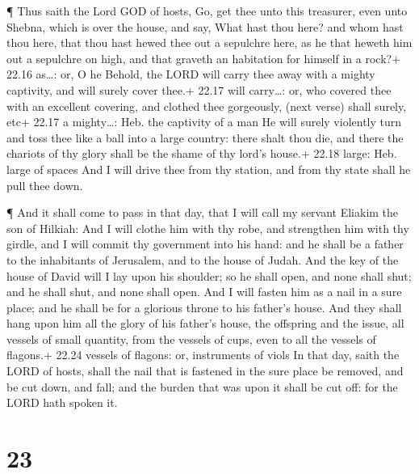 ¶ Thus saith the Lord GOD of hosts, Go, get thee unto this
treasurer, even unto Shebna, which is over the house, and say,
 What hast thou here? and whom hast thou here, that thou
hast hewed thee out a sepulchre here, as he that heweth him out a
sepulchre on high, and that graveth an habitation for himself in a
rock?+ 22.16 as\ldots: or, O he  Behold, the LORD will
carry thee away with a mighty captivity, and will surely cover thee.+
22.17 will carry\ldots: or, who covered thee with an excellent covering,
and clothed thee gorgeously, (next verse) shall surely, etc+ 22.17 a
mighty\ldots: Heb. the captivity of a man  He will surely
violently turn and toss thee like a ball into a large country: there
shalt thou die, and there the chariots of thy glory shall be the shame
of thy lord's house.+ 22.18 large: Heb. large of spaces 
And I will drive thee from thy station, and from thy state shall he pull
thee down.

 ¶ And it shall come to pass in that day, that I will call
my servant Eliakim the son of Hilkiah:  And I will clothe
him with thy robe, and strengthen him with thy girdle, and I will commit
thy government into his hand: and he shall be a father to the
inhabitants of Jerusalem, and to the house of Judah.  And
the key of the house of David will I lay upon his shoulder; so he shall
open, and none shall shut; and he shall shut, and none shall open.
 And I will fasten him as a nail in a sure place; and he
shall be for a glorious throne to his father's house.  And
they shall hang upon him all the glory of his father's house, the
offspring and the issue, all vessels of small quantity, from the vessels
of cups, even to all the vessels of flagons.+ 22.24 vessels of flagons:
or, instruments of viols  In that day, saith the LORD of
hosts, shall the nail that is fastened in the sure place be removed, and
be cut down, and fall; and the burden that was upon it shall be cut off:
for the LORD hath spoken it.

\hypertarget{section-22}{%
\section{23}\label{section-22}}

